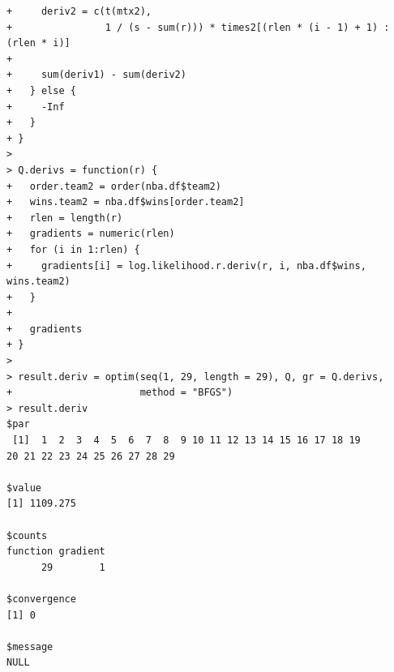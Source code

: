 \documentclass[11pt]{report}
\theoremstyle{definition}
\theoremstyle{remark}
\begin{document}
\begin{enumerate}
\begin{enumerate}
\begin{verbatim}
+     deriv2 = c(t(mtx2), 
+                1 / (s - sum(r))) * times2[(rlen * (i - 1) + 1) : (rlen * i)]
+     
+     sum(deriv1) - sum(deriv2)
+   } else {
+     -Inf
+   }
+ }
> 
> Q.derivs = function(r) {
+   order.team2 = order(nba.df$team2)
+   wins.team2 = nba.df$wins[order.team2]
+   rlen = length(r)
+   gradients = numeric(rlen)
+   for (i in 1:rlen) {
+     gradients[i] = log.likelihood.r.deriv(r, i, nba.df$wins, wins.team2)
+   }
+   
+   gradients
+ }
> 
> result.deriv = optim(seq(1, 29, length = 29), Q, gr = Q.derivs, 
+                      method = "BFGS")
> result.deriv
$par
 [1]  1  2  3  4  5  6  7  8  9 10 11 12 13 14 15 16 17 18 19 
20 21 22 23 24 25 26 27 28 29

$value
[1] 1109.275

$counts
function gradient 
      29        1 

$convergence
[1] 0

$message
NULL


\end{verbatim}
\end{enumerate}
\end{enumerate}
\end{document}

